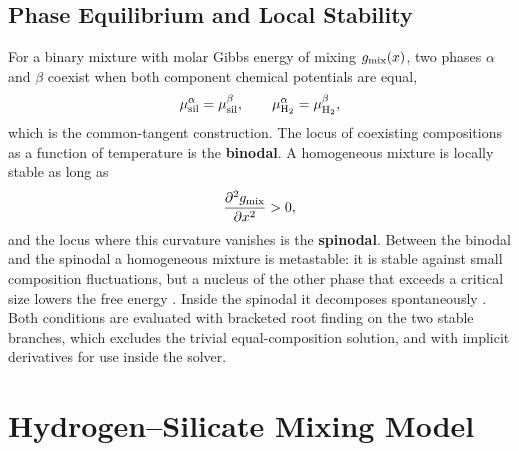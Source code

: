 \subsection{Phase Equilibrium and Local Stability}

For a binary mixture with molar Gibbs energy of mixing $g_{\rm mix}(x)$, two phases $\alpha$
and $\beta$ coexist when both component chemical potentials are equal,
\begin{equation}
\mu_{\rm sil}^{\alpha} = \mu_{\rm sil}^{\beta},\qquad
\mu_{\rm H_2}^{\alpha} = \mu_{\rm H_2}^{\beta},
\label{eq:coexistence}
\end{equation}
which is the common-tangent construction. The locus of coexisting compositions as a function
of temperature is the \textbf{binodal}. A homogeneous mixture is locally stable as long as
\begin{equation}
\frac{\partial^2 g_{\rm mix}}{\partial x^2} > 0,
\label{eq:stability}
\end{equation}
and the locus where this curvature vanishes is the \textbf{spinodal}. Between the binodal and
the spinodal a homogeneous mixture is metastable: it is stable against small composition
fluctuations, but a nucleus of the other phase that exceeds a critical size lowers the free
energy \cite{debenedetti1996}. Inside the spinodal it decomposes spontaneously
\cite{cahn1961}. Both conditions are evaluated with bracketed root finding on the two stable
branches, which excludes the trivial equal-composition solution, and with implicit
derivatives for use inside the \Atm{} solver.

\section{Hydrogen--Silicate Mixing Model}\label{sec:mixing_model}

